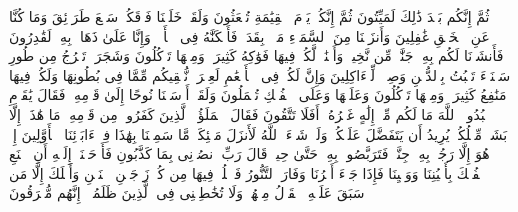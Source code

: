 \stopbuffer
\startbuffer[\q:23:15]
ثُمَّ إِنَّكُم بَعۡدَ ذَٰلِكَ لَمَیِّتُونَ%
\stopbuffer
\startbuffer[\q:23:16]
ثُمَّ إِنَّكُمۡ یَوۡمَ ٱلۡقِیَٰمَةِ تُبۡعَثُونَ%
\stopbuffer
\startbuffer[\q:23:17]
وَلَقَدۡ خَلَقۡنَا فَوۡقَكُمۡ سَبۡعَ طَرَاۤئِقَ وَمَا كُنَّا عَنِ ٱلۡخَلۡقِ غَٰفِلِینَ%
\stopbuffer
\startbuffer[\q:23:18]
وَأَنزَلۡنَا مِنَ ٱلسَّمَاۤءِ مَاۤءَۢ بِقَدَرࣲ فَأَسۡكَنَّٰهُ فِی ٱلۡأَرۡضِۖ وَإِنَّا عَلَىٰ ذَهَابِۭ بِهِۦ لَقَٰدِرُونَ%
\stopbuffer
\startbuffer[\q:23:19]
فَأَنشَأۡنَا لَكُم بِهِۦ جَنَّٰتࣲ مِّن نَّخِیلࣲ وَأَعۡنَٰبࣲ لَّكُمۡ فِیهَا فَوَٰكِهُ كَثِیرَةࣱ وَمِنۡهَا تَأۡكُلُونَ%
\stopbuffer
\startbuffer[\q:23:20]
وَشَجَرَةࣰ تَخۡرُجُ مِن طُورِ سَیۡنَاۤءَ تَنۢبُتُ بِٱلدُّهۡنِ وَصِبۡغࣲ لِّلۡءَاكِلِینَ%
\stopbuffer
\startbuffer[\q:23:21]
وَإِنَّ لَكُمۡ فِی ٱلۡأَنۡعَٰمِ لَعِبۡرَةࣰۖ نُّسۡقِیكُم مِّمَّا فِی بُطُونِهَا وَلَكُمۡ فِیهَا مَنَٰفِعُ كَثِیرَةࣱ وَمِنۡهَا تَأۡكُلُونَ%
\stopbuffer
\startbuffer[\q:23:22]
وَعَلَیۡهَا وَعَلَى ٱلۡفُلۡكِ تُحۡمَلُونَ%
\stopbuffer
\startbuffer[\q:23:23]
وَلَقَدۡ أَرۡسَلۡنَا نُوحًا إِلَىٰ قَوۡمِهِۦ فَقَالَ یَٰقَوۡمِ ٱعۡبُدُوا۟ ٱللَّهَ مَا لَكُم مِّنۡ إِلَٰهٍ غَیۡرُهُۥۤۚ أَفَلَا تَتَّقُونَ%
\stopbuffer
\startbuffer[\q:23:24]
فَقَالَ ٱلۡمَلَؤُا۟ ٱلَّذِینَ كَفَرُوا۟ مِن قَوۡمِهِۦ مَا هَٰذَاۤ إِلَّا بَشَرࣱ مِّثۡلُكُمۡ یُرِیدُ أَن یَتَفَضَّلَ عَلَیۡكُمۡ وَلَوۡ شَاۤءَ ٱللَّهُ لَأَنزَلَ مَلَٰۤئِكَةࣰ مَّا سَمِعۡنَا بِهَٰذَا فِیۤ ءَابَاۤئِنَا ٱلۡأَوَّلِینَ%
\stopbuffer
\startbuffer[\q:23:25]
إِنۡ هُوَ إِلَّا رَجُلُۢ بِهِۦ جِنَّةࣱ فَتَرَبَّصُوا۟ بِهِۦ حَتَّىٰ حِینࣲ%
\stopbuffer
\startbuffer[\q:23:26]
قَالَ رَبِّ ٱنصُرۡنِی بِمَا كَذَّبُونِ%
\stopbuffer
\startbuffer[\q:23:27]
فَأَوۡحَیۡنَاۤ إِلَیۡهِ أَنِ ٱصۡنَعِ ٱلۡفُلۡكَ بِأَعۡیُنِنَا وَوَحۡیِنَا فَإِذَا جَاۤءَ أَمۡرُنَا وَفَارَ ٱلتَّنُّورُ فَٱسۡلُكۡ فِیهَا مِن كُلࣲّ زَوۡجَیۡنِ ٱثۡنَیۡنِ وَأَهۡلَكَ إِلَّا مَن سَبَقَ عَلَیۡهِ ٱلۡقَوۡلُ مِنۡهُمۡۖ وَلَا تُخَٰطِبۡنِی فِی ٱلَّذِینَ ظَلَمُوۤا۟ إِنَّهُم مُّغۡرَقُونَ%
\stopbuffer
